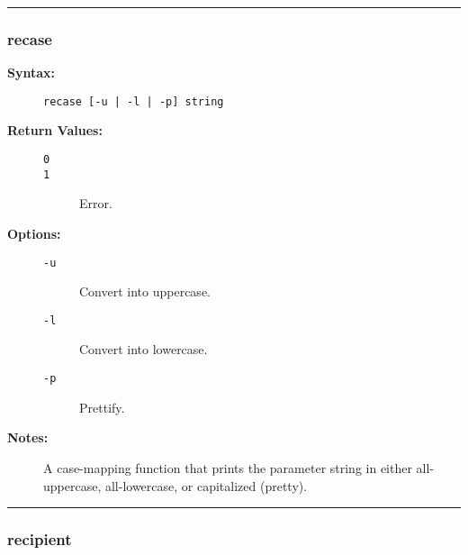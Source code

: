 \hrule
\subsubsection{recase}

\begin{description}
\item[{\bf Syntax:}] \mbox{}

{\tt recase [-u \verb/|/ -l \verb/|/ -p] string}

\item[{\bf Return Values:}] \mbox{}

\begin{description}
\item[{\tt 0}] \mbox{}



\item[{\tt 1}] \mbox{}

Error.

\end{description}


\item[{\bf Options:}] \mbox{}

\begin{description}
\item[{\tt -u}] \mbox{}

Convert into uppercase.

\item[{\tt -l}] \mbox{}

Convert into lowercase.

\item[{\tt -p}] \mbox{}

Prettify.

\end{description}


\item[{\bf Notes:}] \mbox{}

A case-mapping function that prints the parameter 
string in either all-uppercase, all-lowercase, or capitalized (pretty).

\end{description}


\hrule
\subsubsection{recipient}

